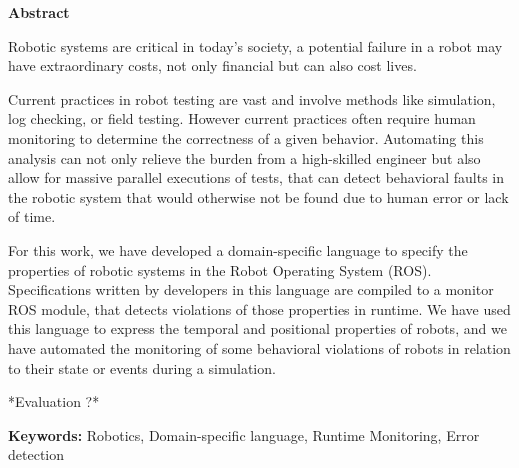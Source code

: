 \vspace*{2cm}
\begin{center}
\Large \bf Abstract
\end{center}
\vspace*{1cm} \setlength{\baselineskip}{0.6cm}

Robotic systems are critical in today's society, a potential failure in a robot may have extraordinary costs, not only financial but can also cost lives.

Current practices in robot testing are vast and involve methods like simulation, log checking, or field testing. However current practices often require human monitoring to determine the correctness of a given behavior. Automating this analysis can not only relieve the burden from a high-skilled engineer but also allow for massive parallel executions of tests, that can detect behavioral faults in the robotic system that would otherwise not be found due to human error or lack of time.

For this work, we have developed a domain-specific language to specify the properties of robotic systems in the Robot Operating System (ROS). Specifications written by developers in this language are compiled to a monitor ROS module, that detects violations of those properties in runtime. We have used this language to express the temporal and positional properties of robots, and we have automated the monitoring of some behavioral violations of robots in relation to their state or events during a simulation.

*Evaluation ?*

\vfill

\begin{flushleft}
\textbf{Keywords:}
Robotics, Domain-specific language, Runtime Monitoring, Error detection
\end{flushleft}
